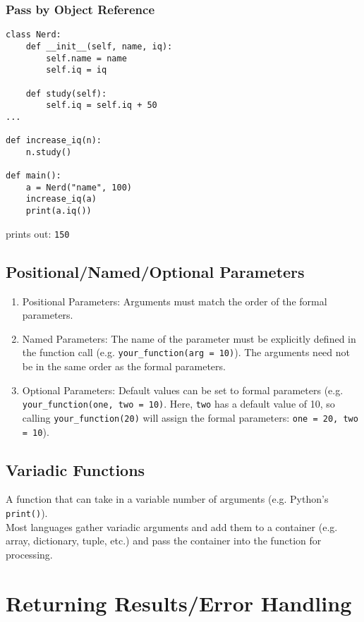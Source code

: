 \documentclass{article}
\begin{document}
\subsubsection*{Pass by Object Reference}
\begin{verbatim}
class Nerd:
    def __init__(self, name, iq):
        self.name = name
        self.iq = iq

    def study(self):
        self.iq = self.iq + 50
...

def increase_iq(n):
    n.study()

def main():
    a = Nerd("name", 100)
    increase_iq(a)
    print(a.iq())
\end{verbatim}
prints out: \texttt{150}






\subsection{Positional/Named/Optional Parameters}
\begin{enumerate}[label=(\roman*)]
\item Positional Parameters: Arguments must match the order of the
  formal parameters.
\item Named Parameters: The name of the parameter must be explicitly
  defined in the function call (e.g. \texttt{your\_function(arg =
    10)}). The arguments need not be in the same order as the formal parameters.
\item Optional Parameters: Default values can be set to formal
  parameters (e.g. \texttt{your\_function(one, two = 10)}. Here,
  \texttt{two} has a default value of 10, so calling
  \texttt{your\_function(20)} will assign the formal parameters: \texttt{one = 20, two = 10}).
\end{enumerate}

\subsection{Variadic Functions}
A function that can take in a variable number of arguments
(e.g. Python's \texttt{print()}). \\
Most languages gather variadic arguments and add them to a container
(e.g. array, dictionary, tuple, etc.) and pass the container into the
function for processing.






\section{Returning Results/Error Handling}
\end{document}
